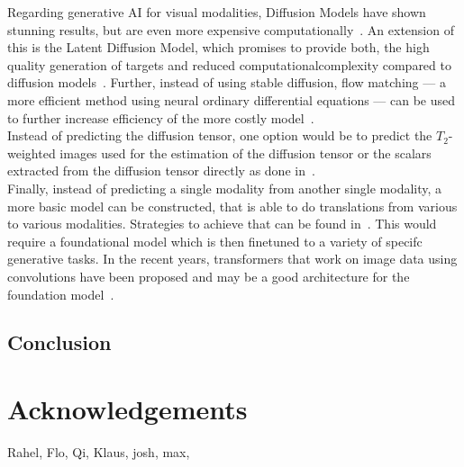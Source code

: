 Regarding generative AI for visual modalities, Diffusion Models have shown stunning results, but are even more expensive computationally~\autocite{wang_pretraining_2022}.
An extension of this is the Latent Diffusion Model, which promises to provide both, the high quality generation of targets and reduced computationalcomplexity compared to diffusion models~\autocite{rombach_high-resolution_2022}.
Further, instead of using stable diffusion, flow matching --- a more efficient method using neural ordinary differential equations --- can be used to further increase efficiency of the more costly model~\autocite{tong_improving_2024}. \\

Instead of predicting the diffusion tensor, one option would be to predict the $T_2$-weighted images used for the estimation of the diffusion tensor or the scalars extracted from the diffusion tensor directly as done in~\autocite{birk_high-resolution_2022}. \\

Finally, instead of predicting a single modality from another single modality, a more basic model can be constructed, that is able to do translations from various to various modalities.
Strategies to achieve that can be found in~\autocite{ruder_overview_2017, pfeiffer_modular_2024}.
This would require a foundational model which is then finetuned to a variety of specifc generative tasks.
In the recent years, transformers that work on image data using convolutions have been proposed and may be a good architecture for the foundation model~\autocite{dosovitskiy_image_2021, hatamizadeh_swin_2022}.

\section{Conclusion}

\chapter{Acknowledgements}
Rahel, Flo, Qi, Klaus, josh, max,
